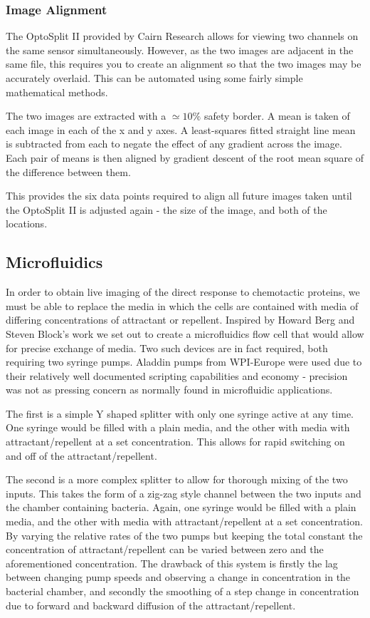 \documentclass[../main.tex]{subfiles}
\begin{document}
\subsubsection{Image Alignment}

The OptoSplit II provided by Cairn Research allows for viewing two channels on the same sensor simultaneously. However, as the two images are adjacent in the same file, this requires you to create an alignment so that the two images may be accurately overlaid. This can be automated using some fairly simple mathematical methods.

The two images are extracted with a \(\simeq10\%\) safety border. A mean is taken of each image in each of the x and y axes. A least-squares fitted straight line mean is subtracted from each to negate the effect of any gradient across the image. Each pair of means is then aligned by gradient descent of the root mean square of the difference between them.

This provides the six data points required to align all future images taken until the OptoSplit II is adjusted again - the size of the image, and both of the locations.

\subsection{Microfluidics}

In order to obtain live imaging of the direct response to chemotactic proteins, we must be able to replace the media in which the cells are contained with media of differing concentrations of attractant or repellent. Inspired by Howard Berg and Steven Block's work\cite{berg84} we set out to create a microfluidics flow cell that would allow for precise exchange of media. Two such devices are in fact required, both requiring two syringe pumps. Aladdin pumps from WPI-Europe were used due to their relatively well documented scripting capabilities and economy - precision was not as pressing concern as normally found in microfluidic applications.

The first is a simple Y shaped splitter with only one syringe active at any time. One syringe would be filled with a plain media, and the other with media with attractant/repellent at a set concentration. This allows for rapid switching on and off of the attractant/repellent.

The second is a more complex splitter to allow for thorough mixing of the two inputs. This takes the form of a zig-zag style channel between the two inputs and the chamber containing bacteria. Again, one syringe would be filled with a plain media, and the other with media with attractant/repellent at a set concentration. By varying the relative rates of the two pumps but keeping the total constant the concentration of attractant/repellent can be varied between zero and the aforementioned concentration. The drawback of this system is firstly the lag between changing pump speeds and observing a change in concentration in the bacterial chamber, and secondly the smoothing of a step change in concentration due to forward and backward diffusion of the attractant/repellent.
\end{document}
